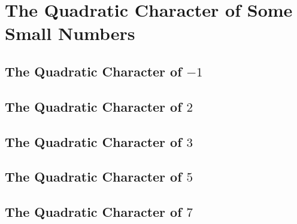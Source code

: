 \chapter{The Quadratic Character of Some Small Numbers}

\section{The Quadratic Character of \texorpdfstring{$-1$}{-1}}

\section{The Quadratic Character of \texorpdfstring{$2$}{2}}

\section{The Quadratic Character of \texorpdfstring{$3$}{3}}

\section{The Quadratic Character of \texorpdfstring{$5$}{5}}

\section{The Quadratic Character of \texorpdfstring{$7$}{7}}



